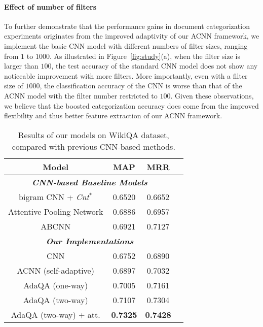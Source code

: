 \documentclass[11pt,a4paper]{article}
\begin{document}
\paragraph{Effect of number of filters} To further demonstrate that the performance gains in document categorization experiments originates from the improved adaptivity of our ACNN framework, we implement the basic CNN model with different numbers of filter sizes, ranging from $1$ to $1000$. As illustrated in Figure~\ref{fig:study}(a), when the filter size is larger than $100$, the test accuracy of the standard CNN model does not show any noticeable improvement with more filters. More importantly, even with a filter size of $1000$, the classification accuracy of the CNN is worse than that of the ACNN model with the filter number restricted to $100$. Given these observations, we believe that the boosted categorization accuracy does come from the improved flexibility and thus better feature extraction of our ACNN framework.
\begin{table}
	\centering
	\begin{tabular}{c|c|cc}
		\toprule[1.2pt]
		\textbf{Model} &  \textbf{MAP} &  \textbf{MRR}   \\
		\hline
		\multicolumn{3}{c}{\emph{\textbf{CNN-based Baseline Models}}} \\
		\hline
		bigram CNN + \emph{Cnt}$^{\ast}$      & 0.6520 & 0.6652 \\
		Attentive Pooling Network     & 0.6886 & 0.6957 \\
		ABCNN     & 0.6921 & 0.7127 \\
		\hline
		\multicolumn{3}{c}{\emph{\textbf{Our Implementations}}} \\
		\hline
		CNN        & 0.6752 & 0.6890 \\
		ACNN (self-adaptive)         & 0.6897 & 0.7032  \\
		AdaQA (one-way)         & 0.7005 & 0.7161  \\ 
		AdaQA (two-way)       & 0.7107 & 0.7304  \\ 
		AdaQA (two-way) + att. & \textbf{0.7325} & \textbf{0.7428}  \\ 
		\bottomrule[1.2pt]
	\end{tabular}
	\caption{\small Results of our models on WikiQA dataset, compared with previous CNN-based methods.}
	\label{tab:wikiqa}
	\vspace{-5mm}
\end{table}
\vspace{-1mm}
\end{document}
